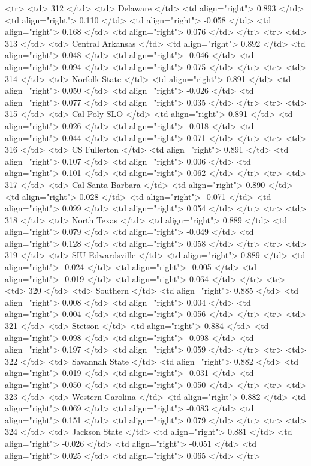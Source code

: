   <tr> <td> 312 </td> <td> Delaware </td> <td align="right"> 0.893 </td> <td align="right"> 0.110 </td> <td align="right"> -0.058 </td> <td align="right"> 0.168 </td> <td align="right"> 0.076 </td> </tr>
  <tr> <td> 313 </td> <td> Central Arkansas </td> <td align="right"> 0.892 </td> <td align="right"> 0.048 </td> <td align="right"> -0.046 </td> <td align="right"> 0.094 </td> <td align="right"> 0.075 </td> </tr>
  <tr> <td> 314 </td> <td> Norfolk State </td> <td align="right"> 0.891 </td> <td align="right"> 0.050 </td> <td align="right"> -0.026 </td> <td align="right"> 0.077 </td> <td align="right"> 0.035 </td> </tr>
  <tr> <td> 315 </td> <td> Cal Poly SLO </td> <td align="right"> 0.891 </td> <td align="right"> 0.026 </td> <td align="right"> -0.018 </td> <td align="right"> 0.044 </td> <td align="right"> 0.071 </td> </tr>
  <tr> <td> 316 </td> <td> CS Fullerton </td> <td align="right"> 0.891 </td> <td align="right"> 0.107 </td> <td align="right"> 0.006 </td> <td align="right"> 0.101 </td> <td align="right"> 0.062 </td> </tr>
  <tr> <td> 317 </td> <td> Cal Santa Barbara </td> <td align="right"> 0.890 </td> <td align="right"> 0.028 </td> <td align="right"> -0.071 </td> <td align="right"> 0.099 </td> <td align="right"> 0.054 </td> </tr>
  <tr> <td> 318 </td> <td> North Texas </td> <td align="right"> 0.889 </td> <td align="right"> 0.079 </td> <td align="right"> -0.049 </td> <td align="right"> 0.128 </td> <td align="right"> 0.058 </td> </tr>
  <tr> <td> 319 </td> <td> SIU Edwardsville </td> <td align="right"> 0.889 </td> <td align="right"> -0.024 </td> <td align="right"> -0.005 </td> <td align="right"> -0.019 </td> <td align="right"> 0.064 </td> </tr>
  <tr> <td> 320 </td> <td> Southern </td> <td align="right"> 0.885 </td> <td align="right"> 0.008 </td> <td align="right"> 0.004 </td> <td align="right"> 0.004 </td> <td align="right"> 0.056 </td> </tr>
  <tr> <td> 321 </td> <td> Stetson </td> <td align="right"> 0.884 </td> <td align="right"> 0.098 </td> <td align="right"> -0.098 </td> <td align="right"> 0.197 </td> <td align="right"> 0.059 </td> </tr>
  <tr> <td> 322 </td> <td> Savannah State </td> <td align="right"> 0.882 </td> <td align="right"> 0.019 </td> <td align="right"> -0.031 </td> <td align="right"> 0.050 </td> <td align="right"> 0.050 </td> </tr>
  <tr> <td> 323 </td> <td> Western Carolina </td> <td align="right"> 0.882 </td> <td align="right"> 0.069 </td> <td align="right"> -0.083 </td> <td align="right"> 0.151 </td> <td align="right"> 0.079 </td> </tr>
  <tr> <td> 324 </td> <td> Jackson State </td> <td align="right"> 0.881 </td> <td align="right"> -0.026 </td> <td align="right"> -0.051 </td> <td align="right"> 0.025 </td> <td align="right"> 0.065 </td> </tr>
